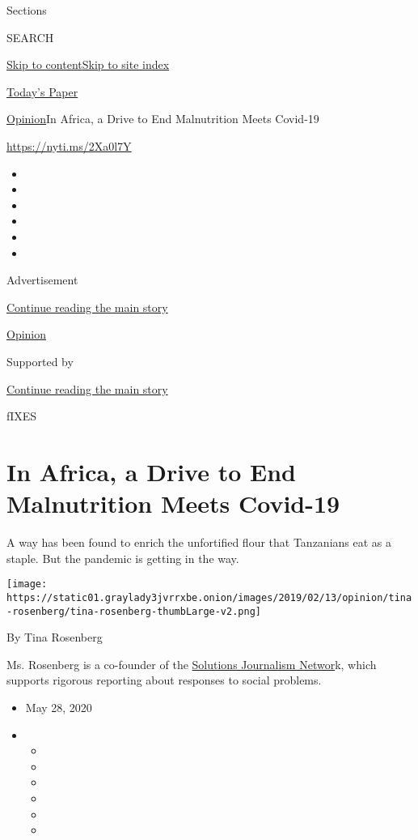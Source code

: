 Sections

SEARCH

\protect\hyperlink{site-content}{Skip to
content}\protect\hyperlink{site-index}{Skip to site index}

\href{https://myaccount.nytimes3xbfgragh.onion/auth/login?response_type=cookie\&client_id=vi}{}

\href{https://www.nytimes3xbfgragh.onion/section/todayspaper}{Today's
Paper}

\href{/section/opinion}{Opinion}\textbar{}In Africa, a Drive to End
Malnutrition Meets Covid-19

\url{https://nyti.ms/2Xa0l7Y}

\begin{itemize}
\item
\item
\item
\item
\item
\item
\end{itemize}

Advertisement

\protect\hyperlink{after-top}{Continue reading the main story}

\href{/section/opinion}{Opinion}

Supported by

\protect\hyperlink{after-sponsor}{Continue reading the main story}

fIXES

\hypertarget{in-africa-a-drive-to-end-malnutrition-meets-covid-19}{%
\section{In Africa, a Drive to End Malnutrition Meets
Covid-19}\label{in-africa-a-drive-to-end-malnutrition-meets-covid-19}}

A way has been found to enrich the unfortified flour that Tanzanians eat
as a staple. But the pandemic is getting in the way.

\texttt{[image: https://static01.graylady3jvrrxbe.onion/images/2019/02/13/opinion/tina-rosenberg/tina-rosenberg-thumbLarge-v2.png]}

By Tina Rosenberg

Ms. Rosenberg is a co-founder of the
\href{http://solutionsjournalism.org}{Solutions Journalism Networ}k,
which supports rigorous reporting about responses to social problems.

\begin{itemize}
\item
  May 28, 2020
\item
  \begin{itemize}
  \item
  \item
  \item
  \item
  \item
  \item
  \end{itemize}
\end{itemize}

